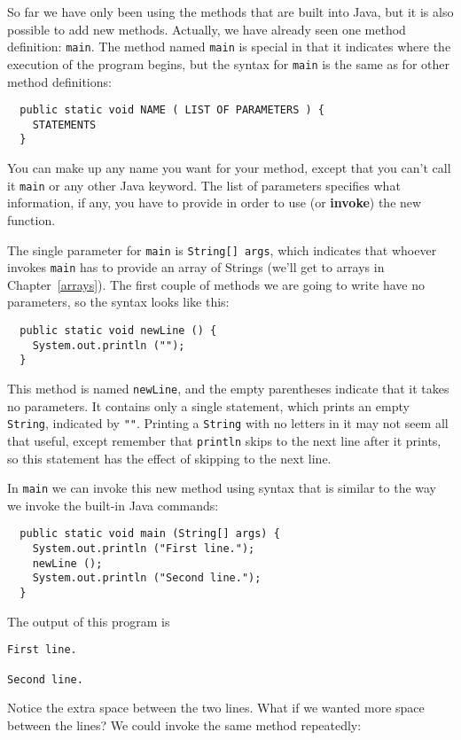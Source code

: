 \documentclass{book}
\begin{document}
So far we have only been using the methods that are built into Java,
but it is also possible to add new methods.  Actually, we have already
seen one method definition: {\tt main}.  The method named {\tt main}
is special in that it indicates where the execution of the program
begins, but the syntax for {\tt main} is the same as for other
method definitions:

\begin{verbatim}
  public static void NAME ( LIST OF PARAMETERS ) {
    STATEMENTS
  }
\end{verbatim}
%
You can make up any name you want for your method, except
that you can't call it {\tt main} or any other
Java keyword.  The list of
parameters specifies what information, if any, you have to
provide in order to use (or {\bf invoke}) the new function.


The single parameter for {\tt main} is {\tt String[] args}, which
indicates that whoever invokes {\tt main} has to provide an array of
Strings (we'll get to arrays in Chapter~\ref{arrays}).  The first
couple of methods we are going to write have no parameters, so the
syntax looks like this:

\begin{verbatim}
  public static void newLine () {
    System.out.println ("");
  }
\end{verbatim}
%
This method is named {\tt newLine}, and the empty parentheses
indicate that it takes no parameters.  It contains only a single
statement, which prints an empty {\tt String}, indicated by {\tt ""}.
Printing a {\tt String} with no letters in it may not seem all that
useful, except remember that {\tt println} skips to the next
line after it prints, so this statement has the effect of
skipping to the next line.

In {\tt main} we can invoke this new method using syntax that
is similar to the way we invoke the built-in Java commands:

\begin{verbatim}
  public static void main (String[] args) {
    System.out.println ("First line.");
    newLine ();
    System.out.println ("Second line.");
  }
\end{verbatim}
%
The output of this program is

\begin{verbatim}
First line.

Second line.
\end{verbatim}
%
Notice the extra space between the two lines.  What if we wanted
more space between the lines?  We could invoke the same
method repeatedly:
\end{document}
